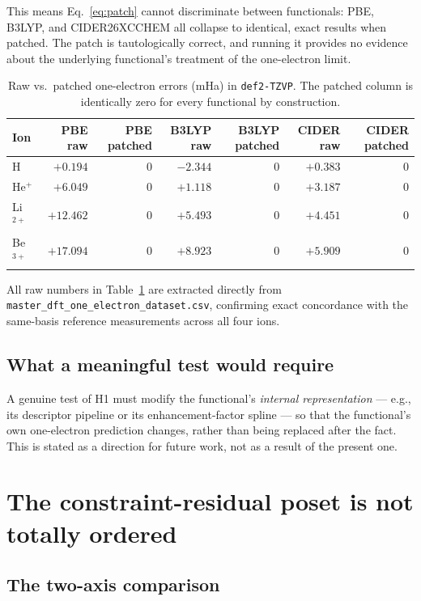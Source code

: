 \documentclass[11pt]{report}
\theoremstyle{definition}
\theoremstyle{remark}
\begin{document}
This means Eq.~\eqref{eq:patch} cannot discriminate between functionals:
PBE, B3LYP, and CIDER26XCCHEM all collapse to identical, exact results
when patched. The patch is tautologically correct, and running it provides
no evidence about the underlying functional's treatment of the one-electron
limit.

\begin{table}[htbp]
\centering
\caption{Raw vs.\ patched one-electron errors (mHa) in \texttt{def2-TZVP}.
The patched column is identically zero for every functional by construction.}
\label{tab:patch}
\begin{tabular}{lrrrrrr}
\toprule
Ion & PBE raw & PBE patched & B3LYP raw & B3LYP patched & CIDER raw & CIDER patched \\
\midrule
H        & $+0.194$ & $0$ & $-2.344$ & $0$ & $+0.383$ & $0$ \\
He$^+$   & $+6.049$ & $0$ & $+1.118$ & $0$ & $+3.187$ & $0$ \\
Li$^{2+}$& $+12.462$& $0$ & $+5.493$ & $0$ & $+4.451$ & $0$ \\
Be$^{3+}$& $+17.094$& $0$ & $+8.923$ & $0$ & $+5.909$ & $0$ \\
\bottomrule
\end{tabular}
\end{table}

All raw numbers in Table~\ref{tab:patch} are extracted directly from
\texttt{master\_dft\_one\_electron\_dataset.csv}, confirming exact concordance
with the same-basis reference measurements across all four ions.

\subsection{What a meaningful test would require}

A genuine test of H1 must modify the functional's \emph{internal
representation} --- e.g., its descriptor pipeline or its enhancement-factor
spline --- so that the functional's own one-electron prediction changes,
rather than being replaced after the fact. This is stated as a direction
for future work, not as a result of the present one.

\section{The constraint-residual poset is not totally ordered}

\subsection{The two-axis comparison}
\end{document}
